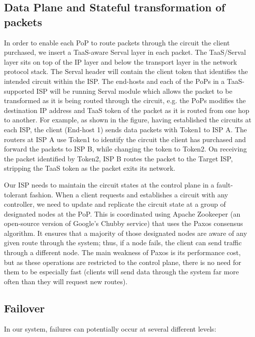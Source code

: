 \documentclass{article}
\begin{document}
\subsection{Data Plane and Stateful transformation of packets}

In order to enable each PoP to route packets through the circuit the
client purchased, we insert a TaaS-aware Serval layer in each
packet. The TaaS/Serval layer sits on top of the IP layer and below
the transport layer in the network protocol stack. The Serval header
will contain the client token that identifies the intended circuit
within the ISP. The end-hosts and each of the PoPs in a TaaS-supported
ISP will be running Serval module which allows the packet to be
transformed as it is being routed through the circuit, e.g. the PoPs
modifies the destination IP address and TaaS token of the packet as it
is routed from one hop to another. For example, as shown in the
figure, having established the circuits at each ISP, the client
(End-host 1) sends data packets with Token1 to ISP A. The routers at
ISP A use Token1 to identify the circuit the client has purchased and
forward the packets to ISP B, while changing the token to Token2. On
receiving the packet identified by Token2, ISP B routes the packet to
the Target ISP, stripping the TaaS token as the packet exits its
network.

Our ISP needs to maintain the circuit states at the control plane in a
fault-tolerant fashion. When a client requests and establishes a
circuit with any controller, we need to update and replicate the
circuit state at a group of designated nodes at the PoP. This is
coordinated using Apache Zookeeper (an open-source version of Google's
Chubby service) that uses the Paxos consensus algorithm. It ensures
that a majority of those designated nodes are aware of any given route
through the system; thus, if a node fails, the client can send traffic
through a different node. The main weakness of Paxos is its
performance cost, but as these operations are restricted to the
control plane, there is no need for them to be especially fast
(clients will send data through the system far more often than they
will request new routes).

\subsection{Failover}

In our system, failures can potentially occur at several different
levels:
\end{document}
